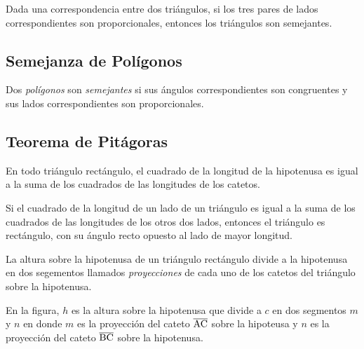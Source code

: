 \begin{theorem}
    Dada una correspondencia entre dos triángulos, si los tres pares de lados correspondientes son proporcionales, entonces los triángulos son semejantes.
\end{theorem}

\subsection{Semejanza de Polígonos}

\begin{definition}
    Dos \textit{polígonos} son \textit{semejantes} si sus ángulos correspondientes son congruentes y sus lados correspondientes son proporcionales.
\end{definition}


\subsection{Teorema de Pitágoras}

\begin{theorem}
    En todo triángulo rectángulo, el cuadrado de la longitud de la hipotenusa es igual a la suma de los cuadrados de las longitudes de los catetos.
\end{theorem}

\begin{theorem}
    Si el cuadrado de la longitud de un lado de un triángulo es igual a la suma de los cuadrados de las longitudes de los otros dos lados, entonces el triángulo es rectángulo, con su ángulo recto opuesto al lado de mayor longitud.
\end{theorem}

\clearpage

\begin{definition}

    La altura sobre la hipotenusa de un triángulo rectángulo divide a la hipotenusa en dos segementos llamados \textit{proyecciones} de cada uno de los catetos del triángulo sobre la hipotenusa.

    \begin{figure}[!h]
        \centering
        
        \label{fig:projection-hypothenuse}
    \end{figure}    

    En la figura, $h$ es la altura sobre la hipotenusa que divide a $c$ en dos segmentos $m$ y $n$ en donde $m$ es la proyección del cateto $\overline{\rm AC}$ sobre la hipoteusa y $n$ es la proyección del cateto $\overline{\rm BC}$ sobre la hipotenusa.
\end{definition}

